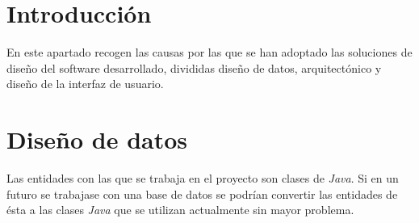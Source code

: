 \label{anex:C}

\section{Introducción}
En este apartado recogen las causas por las que se han adoptado las soluciones de diseño del software desarrollado, divididas diseño de datos, arquitectónico y diseño de la interfaz de usuario.

\section{Diseño de datos}\label{sec:C_2}
Las entidades con las que se trabaja en el proyecto son clases de \textit{Java}. Si en un futuro se trabajase con una base de datos se podrían convertir las entidades de ésta a las clases \textit{Java} que se utilizan actualmente sin mayor problema.

